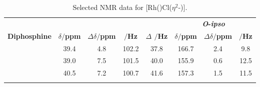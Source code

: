 
\begin{table}
\caption[Selected NMR data for [Rh(\tBuxantphosk)Cl($\eta^2$-){]}]{Selected NMR data for [Rh(\tBuxantphosk)Cl($\eta^2$-)].}
\vspace{1em}
\label{table:dioxygennmr}
\small
\begin{center}
\begin{tabular}{l c c c c c c c}
\toprule{}
	~~ & \multicolumn{4}{c}{\bfseries{\phosphorus}} & \multicolumn{3}{c}{\bfseries{\carbon{} \emph{O}-\emph{ipso}}}\\
	\cmidrule(lr){2-5} \cmidrule(lr){6-8}
	\bfseries{Diphosphine}&\bfseries{$\delta/$ppm}&\bfseries{$\Delta\delta/$ppm}&\bfseries{\JRhP$/$Hz}&\bfseries{$\Delta$ \JRhP$/$Hz}&\bfseries{$\delta/$ppm}&\bfseries{$\Delta\delta/$ppm}&\bfseries{\J{}$/$Hz} \\
	\midrule
	\tBuSixantphos 		& 39.4 & 4.8 & 102.2 & 37.8 & 166.7 & 2.4 & 9.8\\
	\tBuThixantphos 	& 39.0 & 7.5 & 101.5 & 40.0 & 155.9 & 0.6 & 12.5\\
	\tBuXantphos		& 40.5 & 7.2 & 100.7 & 41.6 & 157.3 & 1.5 & 11.5\\
	\bottomrule{}
\end{tabular}
\end{center} 
\end{table}

